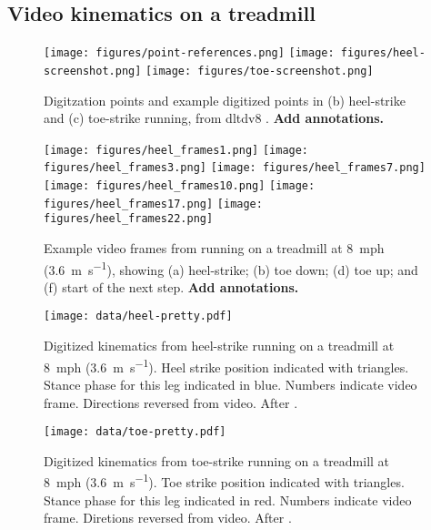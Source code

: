\subsection{Video kinematics on a treadmill}
\begin{figure}
\begin{center}
\texttt{[image: figures/point-references.png]}
\texttt{[image: figures/heel-screenshot.png]}
\texttt{[image: figures/toe-screenshot.png]}
\end{center}
\caption{Digitzation points and example digitized points in (b) heel-strike and (c) toe-strike running, from dltdv8 \citep{hedrick2008software}. \textbf{Add annotations.}} 
\label{fig:methods:dltdv8-1}
\end{figure}


\begin{figure}
\begin{center}
\texttt{[image: figures/heel\_frames1.png]}
\texttt{[image: figures/heel\_frames3.png]}
\texttt{[image: figures/heel\_frames7.png]}\\
\texttt{[image: figures/heel\_frames10.png]}
\texttt{[image: figures/heel\_frames17.png]}
\texttt{[image: figures/heel\_frames22.png]}
\end{center}
\caption{Example video frames from running on a treadmill at \SI{8}{mph} (\SI{3.6}{\meter\per\second}), showing (a) heel-strike; (b) toe down; (d) toe up; and (f) start of the next step. \textbf{Add annotations.}} 
\label{fig:methods:dltdv8-2}
\end{figure}

\begin{figure}
\begin{center}
\texttt{[image: data/heel-pretty.pdf]}
\end{center}
\caption{Digitized kinematics from heel-strike running on a treadmill at \SI{8}{mph} (\SI{3.6}{\meter\per\second}). Heel strike position indicated with triangles. Stance phase for this leg indicated in blue. Numbers indicate video frame. Directions reversed from video. After \citep{marey1873locomotion, muybridge1901human}.}  
\label{fig:results:heelpretty}
\end{figure}

\begin{figure}
\begin{center}
\texttt{[image: data/toe-pretty.pdf]}
\end{center}
\caption{Digitized kinematics from toe-strike running on a treadmill at \SI{8}{mph} (\SI{3.6}{\meter\per\second}). Toe strike position indicated with triangles. Stance phase for this leg indicated in red. Numbers indicate video frame. Diretions reversed from video. After \citep{marey1873locomotion, muybridge1901human}.}  
\label{fig:results:toepretty}
\end{figure}

